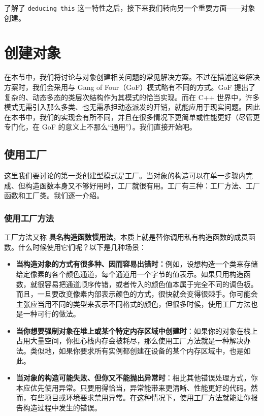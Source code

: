 了解了 \texttt{deducing this} 这一特性之后，接下来我们转向另一个重要方面——对象创建。

\section{创建对象}

\label{idx:565}
在本节中，我们将讨论与对象创建相关问题的常见解决方案。不过在描述这些解决方案时，我们会采用与 Gang of Four（GoF）模式略有不同的方式。GoF 提出了复杂的、动态多态的类层次结构作为其模式的恰当实现。而在 C++ 世界中，许多模式无需引入那么多类、也无需承担动态派发的开销，就能应用于现实问题。因此在本书中，我们的实现会有所不同，并且在很多情况下更简单或性能更好（尽管更专门化，在 GoF 的意义上不那么“通用”）。我们直接开始吧。

\subsection{使用工厂}

\label{idx:566}
这里我们要讨论的第一类创建型模式是工厂。当对象的构造可以在单一步骤内完成、但构造函数本身又不够好用时，工厂就很有用。工厂有三种：工厂方法、工厂函数和工厂类。我们逐一介绍。

\subsubsection{使用工厂方法}

\label{idx:567}
\label{idx:568}
工厂方法又称 \textbf{具名构造函数惯用法}，本质上就是替你调用私有构造函数的成员函数。什么时候使用它们呢？以下是几种场景：

\begin{itemize}
\item \textbf{当构造对象的方式有很多种、因而容易出错时：}例如，设想构造一个类来存储给定像素的各个颜色通道，每个通道用一个字节的值表示。如果只用构造函数，就很容易把通道顺序传错，或者传入的颜色值本属于完全不同的调色板。而且，一旦要改变像素内部表示颜色的方式，很快就会变得很棘手。你可能会主张应当用不同的类型来表示不同格式的颜色，但很多时候，使用工厂方法也是一种可行的做法。
\item \textbf{当你想要强制对象在堆上或某个特定内存区域中创建时}：如果你的对象在栈上占用大量空间，你担心栈内存会被耗尽，那么使用工厂方法就是一种解决办法。类似地，如果你要求所有实例都创建在设备的某个内存区域中，也是如此。
\label{idx:569}
\item \textbf{当对象的构造可能失败、但你又不能抛出异常时}：相比其他错误处理方式，你本应优先使用异常。只要用得恰当，异常能带来更清晰、性能更好的代码。然而，有些项目或环境要求禁用异常。在这种情况下，使用工厂方法就能让你报告构造过程中发生的错误。
\end{itemize}

